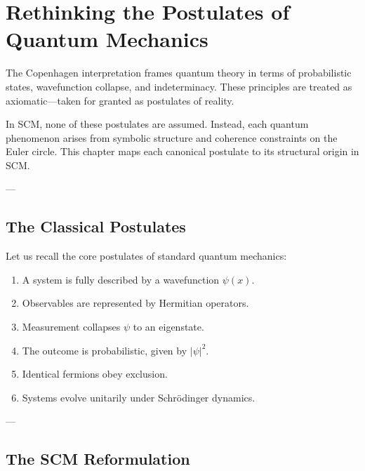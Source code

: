 \chapter{Rethinking the Postulates of Quantum Mechanics} \label{chapter:copenhagen}

The Copenhagen interpretation frames quantum theory in terms of probabilistic states, wavefunction collapse, and indeterminacy. These principles are treated as axiomatic—taken for granted as postulates of reality.

In SCM, none of these postulates are assumed. Instead, each quantum phenomenon arises from symbolic structure and coherence constraints on the Euler circle. This chapter maps each canonical postulate to its structural origin in SCM.

---

\section{The Classical Postulates}

Let us recall the core postulates of standard quantum mechanics:

\begin{enumerate}
    \item A system is fully described by a wavefunction $\psi(x)$.
    \item Observables are represented by Hermitian operators.
    \item Measurement collapses $\psi$ to an eigenstate.
    \item The outcome is probabilistic, given by $|\psi|^2$.
    \item Identical fermions obey exclusion.
    \item Systems evolve unitarily under Schrödinger dynamics.
\end{enumerate}

---

\section{The SCM Reformulation}

